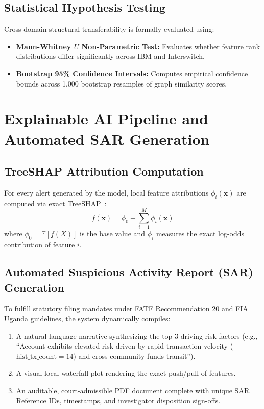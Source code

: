 \subsection{Statistical Hypothesis Testing}
Cross-domain structural transferability is formally evaluated using:
\begin{itemize}
    \item \textbf{Mann-Whitney $U$ Non-Parametric Test:} Evaluates whether feature rank distributions differ significantly across IBM and Interswitch.
    \item \textbf{Bootstrap 95\% Confidence Intervals:} Computes empirical confidence bounds across 1,000 bootstrap resamples of graph similarity scores.
\end{itemize}

\section{Explainable AI Pipeline and Automated SAR Generation}
\subsection{TreeSHAP Attribution Computation}
For every alert generated by the model, local feature attributions $\phi_i(\mathbf{x})$ are computed via exact TreeSHAP~\cite{lundberg2020local}:
\begin{equation}
    f(\mathbf{x}) = \phi_0 + \sum_{i=1}^{M} \phi_i(\mathbf{x})
\end{equation}
where $\phi_0 = \mathbb{E}[f(X)]$ is the base value and $\phi_i$ measures the exact log-odds contribution of feature $i$.

\subsection{Automated Suspicious Activity Report (SAR) Generation}
To fulfill statutory filing mandates under FATF Recommendation 20 and FIA Uganda guidelines, the system dynamically compiles:
\begin{enumerate}
    \item A natural language narrative synthesizing the top-3 driving risk factors (e.g., ``Account exhibits elevated risk driven by rapid transaction velocity ($\text{hist\_tx\_count}=14$) and cross-community funds transit'').
    \item A visual local waterfall plot rendering the exact push/pull of features.
    \item An auditable, court-admissible PDF document complete with unique SAR Reference IDs, timestamps, and investigator disposition sign-offs.
\end{enumerate}

